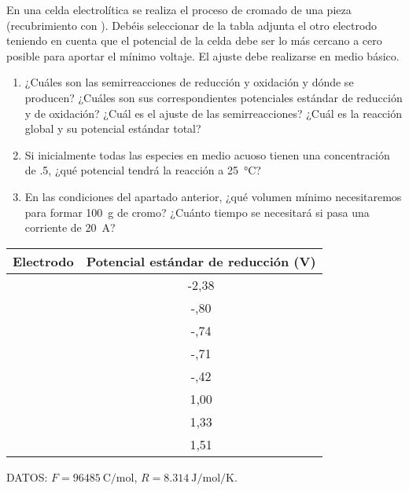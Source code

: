 En una celda electrolítica se realiza el proceso de cromado de una pieza (recubrimiento con ). Debéis seleccionar de la tabla adjunta el otro electrodo teniendo en cuenta que el potencial de la celda debe ser lo más cercano a cero posible para aportar el mínimo voltaje. El ajuste debe realizarse en medio básico.
\begin{enumerate}
	\item ¿Cuáles son las semirreacciones de reducción y oxidación y dónde se producen? ¿Cuáles son sus correspondientes potenciales estándar de reducción y de oxidación? ¿Cuál es el ajuste de las semirreacciones? ¿Cuál es la reacción global y su potencial estándar total?
	\item Si inicialmente todas las especies en medio acuoso tienen una concentración de \SI{,5}{\Molar}, ¿qué potencial tendrá la reacción a \SI{25}{\celsius}?
	\item En las condiciones del apartado anterior, ¿qué volumen mínimo necesitaremos para formar \SI{100}{\gram} de cromo? ¿Cuánto tiempo se necesitará si pasa una corriente de \SI{20}{\ampere}?
\end{enumerate}
{\normalsize
	\begin{center}
		\begin{tabular}{cS}
			\toprule
				Electrodo						&	{Potencial estándar de reducción (\si{\volt})}	\\
			\midrule
							&		-2,38 										\\
				 				&	 	 -,80										\\
							&	 	 -,74 										\\
						&	 	 -,71										\\
						&	 	 -,42 										\\
					&	 	 1,00										\\
						&	 	 1,33										\\
							&	 	 1,51										\\
			\bottomrule
		\end{tabular}
	\end{center}
}
DATOS: $F = \SI{96485}{\coulomb\per\mol}$, $R = \SI{8,314}{\joule\per\mol\per\kelvin}$.

